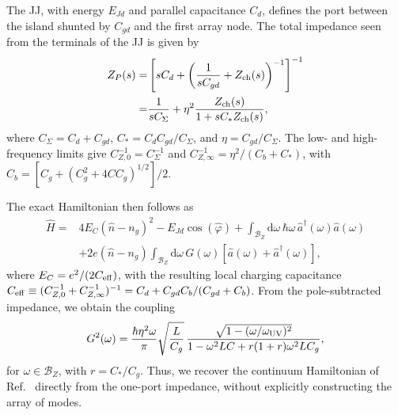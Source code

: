 \documentclass[prx,aps,twocolumn,article]{revtex4-2}
\begin{document}
The \gls{JJ}, with energy $E_{Jd}$ and parallel capacitance $C_d$, defines the port between the island shunted by $C_{gd}$ and the first array node. The total impedance seen from the terminals of the \gls{JJ} is given by
\begin{align}
Z_P(s)
=&
\left[
sC_d+
\left(
\frac{1}{sC_{gd}}+Z_{\rm ch}(s)
\right)^{-1}
\right]^{-1}
\\=&
\frac{1}{sC_\Sigma}
+
\eta^2
\frac{Z_{\rm ch}(s)}
{1+sC_*Z_{\rm ch}(s)},
\label{Eq:JJARegularZ}
\end{align}
where
$C_\Sigma=C_d+C_{gd}$,
$C_*=C_dC_{gd}/C_\Sigma$, and
$\eta=C_{gd}/C_\Sigma$.
The low- and high-frequency limits give
$C_{Z,0}^{-1}=C_\Sigma^{-1}$ and
$C_{Z,\infty}^{-1}=\eta^2/(C_b+C_*)$, with
$C_b=[C_g+(C_g^2+4CC_g)^{1/2}]/2$. 

The exact Hamiltonian then follows as
\begin{align}
\hat H={}&
4E_C(\hat n-n_g)^2-E_{Jd}\cos(\hat\varphi)
+\int_{\mathcal B_Z}
\mathrm d\omega\,
\hbar\omega\,\hat a^\dagger(\omega)\hat a(\omega)
\nonumber\\
&+
2e(\hat n-n_g)
\int_{\mathcal B_Z}
\mathrm d\omega\,
G(\omega)
\left[
\hat a(\omega)+\hat a^\dagger(\omega)
\right],
\label{Eq:JJAExactHamiltonian}
\end{align}
where $E_C=e^2/(2C_{\rm eff})$, with the resulting local charging capacitance
$C_{\rm eff}\equiv(C_{Z,0}^{-1}+C_{Z,\infty}^{-1})^{-1}
=C_d+C_{gd}C_b/(C_{gd}+C_b)$.
From the pole-subtracted impedance, we obtain the coupling
\begin{align}
G^2(\omega)
=
\frac{\hbar\eta^2\omega}{\pi}
\sqrt{\frac{L}{C_g}}\,
\frac{
\sqrt{1-(\omega/\omega_{\rm UV})^2}
}{
1-\omega^2LC+r(1+r)\omega^2LC_g
},
\label{Eq:JJAG}
\end{align}
for $\omega\in\mathcal B_Z$, with $r=C_*/C_g$. Thus, we recover the continuum Hamiltonian of Ref.~\cite{Snyman:2015} directly from the one-port impedance, without explicitly constructing the array of modes.
\end{document}
